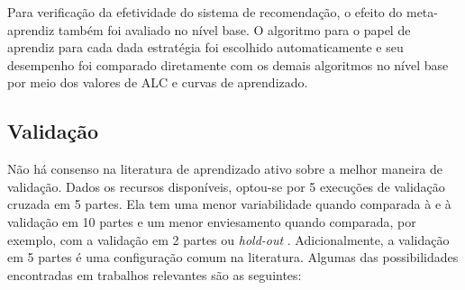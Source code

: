 Para verificação da efetividade do sistema de recomendação, o efeito do meta-aprendiz também foi avaliado no nível base.
O algoritmo para o papel de aprendiz para cada dada estratégia foi escolhido automaticamente e seu desempenho foi comparado diretamente com os demais algoritmos no nível base por meio dos valores de ALC e curvas de aprendizado.

\subsection{Validação}\label{validacao}
Não há consenso na literatura de aprendizado ativo sobre a melhor maneira de validação.
Dados os recursos disponíveis, optou-se por 5 execuções de validação cruzada em 5 partes.
Ela tem uma menor variabilidade quando comparada à  e à validação em 10 partes \cite{journals/neco/KearnsR99} e um menor enviesamento quando comparada, por exemplo, com a validação em 2 partes ou \textit{hold-out} \cite{arlot2010survey}.
Adicionalmente, a validação em 5 partes é uma configuração comum na literatura.
Algumas das possibilidades encontradas em trabalhos relevantes são as seguintes:
